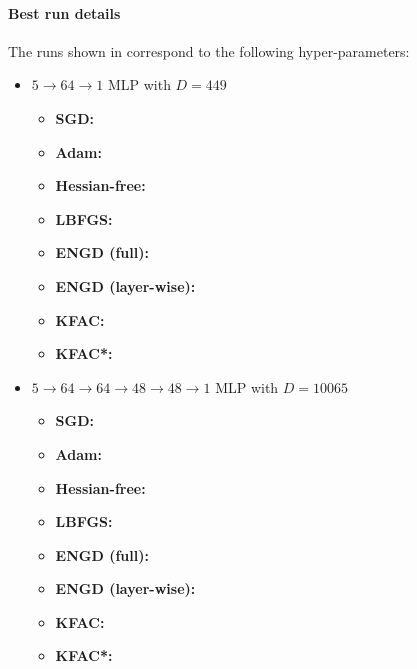 \paragraph{Best run details}
The runs shown in  correspond to the following hyper-parameters:
\begin{itemize}
\item $5\to 64\to 1$ MLP with $D=449$
  \begin{itemize}
    \def\pathToRuns{kfac_pinns_exp/exp10_reproduce_poisson5d/tex}
  \item \textbf{SGD:} 
  \item \textbf{Adam:} 
  \item \textbf{Hessian-free:} 
  \item \textbf{LBFGS:} 
  \item \textbf{ENGD (full):} 
  \item \textbf{ENGD (layer-wise):} 
  \item \textbf{KFAC:} 
  \item \textbf{KFAC*:} 
  \end{itemize}

\item $5 \to 64 \to 64 \to 48 \to 48 \to 1$ MLP with $D=\num{10065}$
  \begin{itemize}
    \def\pathToRuns{kfac_pinns_exp/exp16_poisson5d_deepwide/tex}
  \item \textbf{SGD:} 
  \item \textbf{Adam:} 
  \item \textbf{Hessian-free:} 
  \item \textbf{LBFGS:} 
  \item \textbf{ENGD (full):} 
  \item \textbf{ENGD (layer-wise):} 
  \item \textbf{KFAC:} 
  \item \textbf{KFAC*:} 
  \end{itemize}


\end{itemize}
